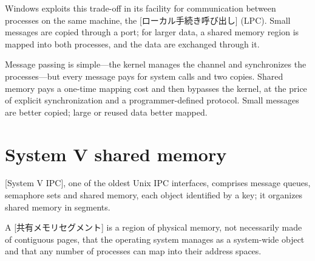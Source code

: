 \documentclass[../main.tex]{subfiles}
\begin{document}
Windows exploits this trade-off in its facility for communication between
processes on the same machine, the
[ローカル手続き呼び出し]
(LPC).  Small
messages are copied through a port; for larger data, a shared memory region is
mapped into both
processes, and the data are exchanged through it.

\begin{keypoint}
  Message passing is simple---the kernel manages the channel and
  synchronizes the processes---but every message pays for system calls and
  two copies.  Shared memory pays a one-time mapping cost and then bypasses
  the kernel, at the price of explicit synchronization and a
  programmer-defined protocol.  Small messages are better copied; large or
  reused data better mapped.
\end{keypoint}

\section{System V shared memory}
\label{sec:l09-sysv}

[System V IPC], one of the oldest Unix
IPC interfaces, comprises message queues, semaphore sets and shared
memory, each object identified by a key; it organizes shared memory in
segments.

\begin{definition}
  A [共有メモリセグメント] is a region of
  physical memory, not necessarily made of contiguous pages, that the
  operating system manages as a system-wide object and that any number of
  processes can map into their address spaces.
\end{definition}
\end{document}
